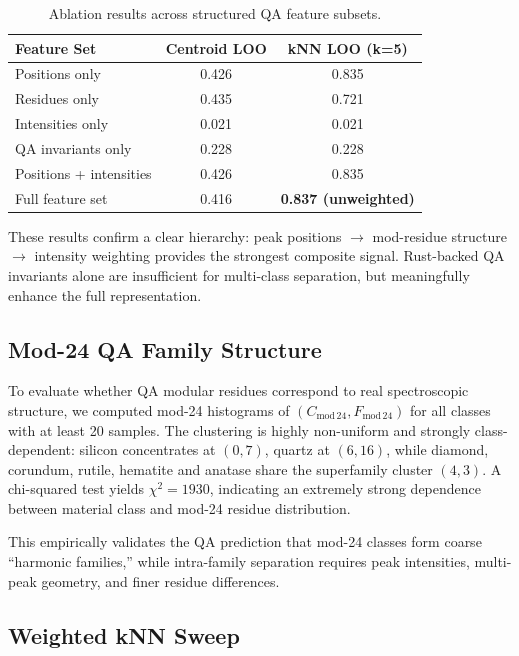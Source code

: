 \documentclass[12pt]{article}
\begin{document}
\begin{table}[h]
\centering
\begin{tabular}{l c c}
\hline
Feature Set & Centroid LOO & kNN LOO (k=5) \\
\hline
Positions only & 0.426 & 0.835 \\
Residues only & 0.435 & 0.721 \\
Intensities only & 0.021 & 0.021 \\
QA invariants only & 0.228 & 0.228 \\
Positions + intensities & 0.426 & 0.835 \\
Full feature set & 0.416 & \textbf{0.837 (unweighted)} \\
\hline
\end{tabular}
\caption{Ablation results across structured QA feature subsets.}
\label{tab:ablation}
\end{table}

These results confirm a clear hierarchy:
peak positions $\rightarrow$ mod-residue structure $\rightarrow$ intensity weighting
provides the strongest composite signal.
Rust-backed QA invariants alone are insufficient for multi-class separation,
but meaningfully enhance the full representation.

\subsection{Mod-24 QA Family Structure}

To evaluate whether QA modular residues correspond to real spectroscopic structure,
we computed mod-24 histograms of $(C_{\mathrm{mod}\,24},F_{\mathrm{mod}\,24})$ for all classes
with at least 20 samples.
The clustering is highly non-uniform and strongly class-dependent:
silicon concentrates at $(0,7)$, quartz at $(6,16)$,
while diamond, corundum, rutile, hematite and anatase share the
superfamily cluster $(4,3)$.
A chi-squared test yields $\chi^2 = 1930$, indicating an extremely strong
dependence between material class and mod-24 residue distribution.

This empirically validates the QA prediction that mod-24 classes form
coarse ``harmonic families,''
while intra-family separation requires peak intensities,
multi-peak geometry, and finer residue differences.

\subsection{Weighted kNN Sweep}
\end{document}
